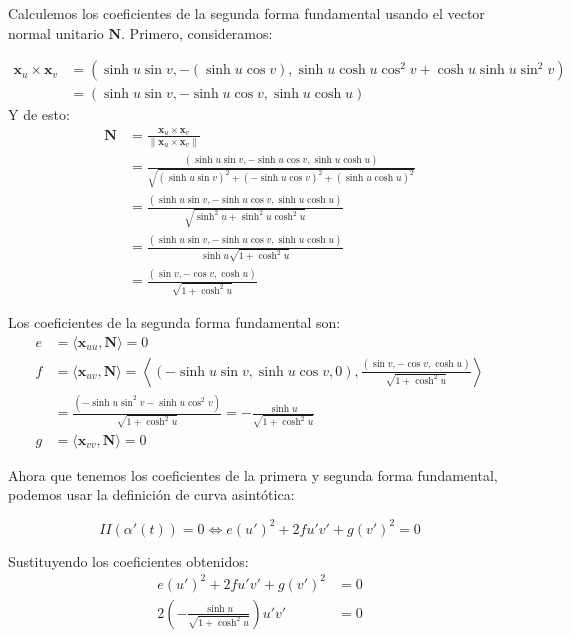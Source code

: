 \begin{problema}
\begin{sol}
Calculemos los coeficientes de la segunda forma fundamental usando el vector normal unitario $\mathbf{N}$. Primero, consideramos: 

\begin{align*}
    \mathbf{x}_u \times \mathbf{x}_v &=(\sinh u \sin v,-(\sinh u \cos v), \sinh u \cosh u \cos^2 v + \cosh u\sinh u \sin^2v)\\
    &=  (\sinh u \sin v,-\sinh u \cos v, \sinh u \cosh u)
\end{align*}
Y de esto:
\begin{align*}
    \mathbf{N} &= \frac{\mathbf{x}_u \times \mathbf{x}_v}{\| \mathbf{x}_u \times \mathbf{x}_v \|}\\
    & = \frac{(\sinh u \sin v,-\sinh u \cos v, \sinh u \cosh u)}{\sqrt{(\sinh u \sin v)^2 + (-\sinh u \cos v)^2+(\sinh u \cosh u)^2}}\\
    & = \frac{(\sinh u \sin v,-\sinh u \cos v, \sinh u \cosh u)}{\sqrt{\sinh^2 u +\sinh ^2 u\cosh^2 u}}\\
    & = \frac{(\sinh u \sin v,-\sinh u \cos v, \sinh u \cosh u)}{\sinh u\sqrt{1+\cosh^2 u}}\\
    &=  \frac{(\sin v,-\cos v, \cosh u)}{\sqrt{1+\cosh^2 u}}
\end{align*}



Los coeficientes de la segunda forma fundamental son:
\begin{align*}
    e &= \langle \mathbf{x}_{uu}, \mathbf{N} \rangle = 0\\
f &= \langle \mathbf{x}_{uv}, \mathbf{N} \rangle =\left\langle (-\sinh u \sin v, \sinh u \cos v, 0), \frac{(\sin v,-\cos v, \cosh u)}{\sqrt{1+\cosh^2 u}} \right\rangle \\
&= \frac{\left(-\sinh u\sin^2 v -\sinh u \cos^2 v \right)}{\sqrt{1+\cosh^2 u}}=-\frac{\sinh u }{\sqrt{1+\cosh^2 u}}\\
g &= \langle \mathbf{x}_{vv}, \mathbf{N} \rangle = 0
\end{align*}


Ahora que tenemos los coeficientes de la primera y segunda forma fundamental, podemos usar la definición de curva asintótica:

$$
II(\alpha'(t)) = 0 \iff e(u')^2 + 2fu'v' + g(v')^2 = 0
$$

Sustituyendo los coeficientes obtenidos:
\begin{align*}
    e(u')^2 + 2fu'v' + g(v')^2 &= 0\\
   2\left(-\frac{\sinh u }{\sqrt{1+\cosh^2 u}}\right)u'v'  &= 0
\end{align*}



\end{sol}
\end{problema}
